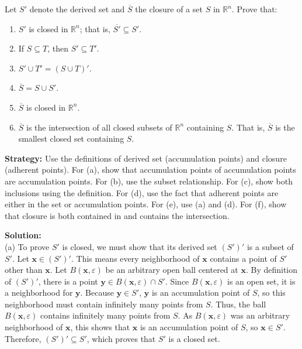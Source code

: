 \begin{problembox}
\begin{problemstatement}
Let $S'$ denote the derived set and $\overline{S}$ the closure of a set $S$ in $\mathbb{R}^n$. Prove that:
\begin{enumerate}[label=\alph*)]
\item $S'$ is closed in $\mathbb{R}^n$; that is, $\overline{S'} \subseteq S'$.
\item If $S \subseteq T$, then $S' \subseteq T'$.
\item $S' \cup T' = (S \cup T)'$.
\item $\overline{S} = S \cup S'$.
\item $\overline{S}$ is closed in $\mathbb{R}^n$.
\item $\overline{S}$ is the intersection of all closed subsets of $\mathbb{R}^n$ containing $S$. That is, $\overline{S}$ is the smallest closed set containing $S$.
\end{enumerate}
\end{problemstatement}
\end{problembox}

\noindent\textbf{Strategy:} Use the definitions of derived set (accumulation points) and closure (adherent points). For (a), show that accumulation points of accumulation points are accumulation points. For (b), use the subset relationship. For (c), show both inclusions using the definition. For (d), use the fact that adherent points are either in the set or accumulation points. For (e), use (a) and (d). For (f), show that closure is both contained in and contains the intersection.

\bigskip\noindent\textbf{Solution:}\\
(a) To prove $S'$ is closed, we must show that its derived set $(S')'$ is a subset of $S'$. Let $\mathbf{x} \in (S')'$. This means every neighborhood of $\mathbf{x}$ contains a point of $S'$ other than $\mathbf{x}$. Let $B(\mathbf{x}, \varepsilon)$ be an arbitrary open ball centered at $\mathbf{x}$. By definition of $(S')'$, there is a point $\mathbf{y} \in B(\mathbf{x}, \varepsilon) \cap S'$. Since $B(\mathbf{x}, \varepsilon)$ is an open set, it is a neighborhood for $\mathbf{y}$. Because $\mathbf{y} \in S'$, $\mathbf{y}$ is an accumulation point of $S$, so this neighborhood must contain infinitely many points from $S$. Thus, the ball $B(\mathbf{x}, \varepsilon)$ contains infinitely many points from $S$. As $B(\mathbf{x}, \varepsilon)$ was an arbitrary neighborhood of $\mathbf{x}$, this shows that $\mathbf{x}$ is an accumulation point of $S$, so $\mathbf{x} \in S'$. Therefore, $(S')' \subseteq S'$, which proves that $S'$ is a closed set.

